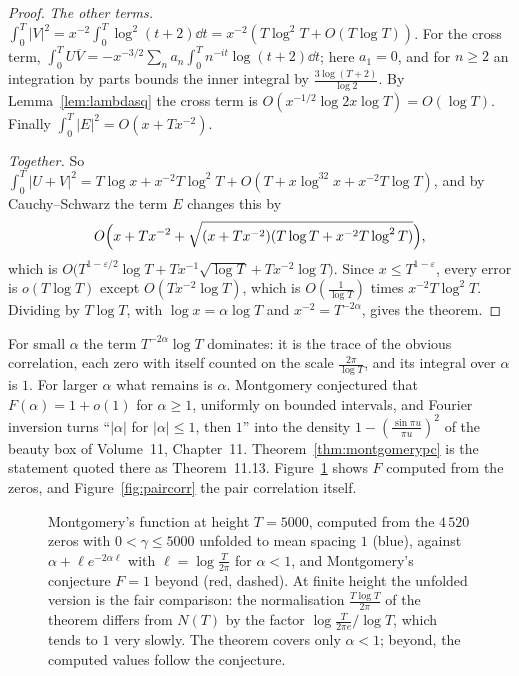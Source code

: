 \begin{proof}
\emph{The other terms.} $\int_0^T|V|^2=x^{-2}\int_0^T\log^2(t+2)\dd t=x^{-2}(T\log^2T+O(T\log T))$. For the cross term, $\int_0^TU\overline V=-x^{-3/2}\sum_na_n\int_0^Tn^{-it}\log(t+2)\dd t$; here $a_1=0$, and for $n\ge2$ an integration by parts bounds the inner integral by $\frac{3\log(T+2)}{\log2}$. By Lemma~\ref{lem:lambdasq} the cross term is $O(x^{-1/2}\log2x\log T)=O(\log T)$. Finally $\int_0^T|E|^2=O(x+Tx^{-2})$.

\emph{Together.} So $\int_0^T|U+V|^2=T\log x+x^{-2}T\log^2T+O(T+x\log^32x+x^{-2}T\log T)$, and by Cauchy--Schwarz the term $E$ changes this by
\[
O\Bigl(x+Tx^{-2}+\sqrt{(x+Tx^{-2})(T\log T+x^{-2}T\log^2T)}\Bigr),
\]
which is $O\bigl(T^{1-\varepsilon/2}\log T+Tx^{-1}\sqrt{\log T}+Tx^{-2}\log T\bigr)$.
Since $x\le T^{1-\varepsilon}$, every error is $o(T\log T)$ except $O(Tx^{-2}\log T)$, which is $O(\frac1{\log T})$ times $x^{-2}T\log^2T$. Dividing by $T\log T$, with $\log x=\alpha\log T$ and $x^{-2}=T^{-2\alpha}$, gives the theorem.
\end{proof}

For small $\alpha$ the term $T^{-2\alpha}\log T$ dominates: it is the trace of the obvious correlation, each zero with itself counted on the scale $\frac{2\pi}{\log T}$, and its integral over $\alpha$ is $1$. For larger $\alpha$ what remains is $\alpha$. Montgomery conjectured that $F(\alpha)=1+o(1)$ for $\alpha\ge1$, uniformly on bounded intervals, and Fourier inversion turns ``$|\alpha|$ for $|\alpha|\le1$, then $1$'' into the density $1-(\frac{\sin\pi u}{\pi u})^2$ of the beauty box of Volume~11, Chapter~11. Theorem~\ref{thm:montgomerypc} is the statement quoted there as Theorem~11.13. Figure~\ref{fig:falpha} shows $F$ computed from the zeros, and Figure~\ref{fig:paircorr} the pair correlation itself.

\begin{figure}[ht]
\centering
{}
\caption{Montgomery's function at height $T=5000$, computed from the $4\,520$ zeros with $0<\gamma\le5000$ unfolded to mean spacing $1$ (blue), against $\alpha+\ell e^{-2\alpha\ell}$ with $\ell=\log\frac T{2\pi}$ for $\alpha<1$, and Montgomery's conjecture $F=1$ beyond (red, dashed). At finite height the unfolded version is the fair comparison: the normalisation $\frac{T\log T}{2\pi}$ of the theorem differs from $N(T)$ by the factor $\log\frac T{2\pi e}/\log T$, which tends to $1$ very slowly. The theorem covers only $\alpha<1$; beyond, the computed values follow the conjecture.}
\label{fig:falpha}
\end{figure}

